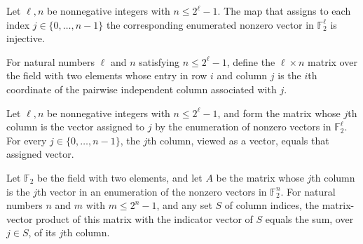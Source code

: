 \begin{theorem}
\label{FABL.pairwiseIndependentColumn_injective}
\leanok
{}
Let $\ell,n$ be nonnegative integers with $n\le 2^\ell-1$. The map that assigns to each
index $j\in\{0,\ldots,n-1\}$ the corresponding enumerated nonzero vector in $\mathbb
F_2^\ell$ is injective.
\end{theorem}

\begin{definition}
\label{FABL.pairwiseIndependentMatrix}
\leanok
{}
For natural numbers $\ell$ and $n$ satisfying $n \le 2^\ell - 1$, define the $\ell\times
n$ matrix over the field with two elements whose entry in row $i$ and column $j$ is the
$i$th coordinate of the pairwise independent column associated with $j$.
\end{definition}

\begin{theorem}
\label{FABL.pairwiseIndependentMatrix_column}
\leanok
{}
Let $\ell,n$ be nonnegative integers with $n\le 2^\ell-1$, and form the matrix whose
$j$th column is the vector assigned to $j$ by the enumeration of nonzero vectors in
$\mathbb F_2^\ell$. For every $j\in\{0,\ldots,n-1\}$, the $j$th column, viewed as a
vector, equals that assigned vector.
\end{theorem}

\begin{theorem}
\label{FABL.matrixColumnSum_pairwiseIndependentMatrix}
\leanok
{}
Let $\mathbb{F}_2$ be the field with two elements, and let $A$ be the matrix whose $j$th column is the $j$th vector in an enumeration of the nonzero vectors in $\mathbb{F}_2^n$. For natural numbers $n$ and $m$ with $m\leq 2^n-1$, and any set $S$ of column indices, the matrix-vector product of this matrix with the indicator vector of $S$ equals the sum, over $j\in S$, of its $j$th column.
\end{theorem}

